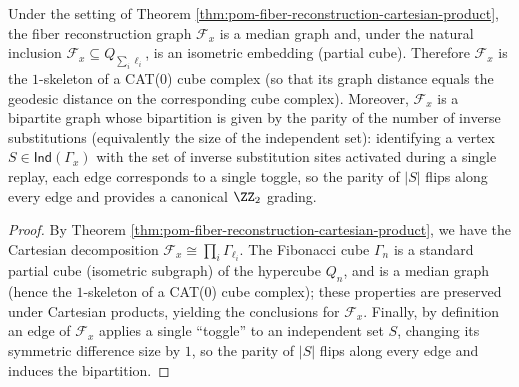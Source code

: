 \begin{corollary}\label{cor:pom-fiber-reconstruction-median-partialcube-cat0}
Under the setting of Theorem \ref{thm:pom-fiber-reconstruction-cartesian-product},
the fiber reconstruction graph \(\mathcal F_x\) is a median graph and, under the natural inclusion
\(
\mathcal F_x\subseteq Q_{\sum_i \ell_i}
\),
is an isometric embedding (partial cube).
Therefore \(\mathcal F_x\) is the \(1\)-skeleton of a CAT(0) cube complex (so that its graph distance equals the geodesic distance on the corresponding cube complex).
Moreover, \(\mathcal F_x\) is a bipartite graph whose bipartition is given by the parity of the number of inverse substitutions (equivalently the size of the independent set):
identifying a vertex \(S\in\mathsf{Ind}(\Gamma_x)\) with the set of inverse substitution sites activated during a single replay, each edge corresponds to a single toggle,
so the parity of \(|S|\) flips along every edge and provides a canonical \(\ZZ_2\) grading.
\end{corollary}
\begin{proof}
By Theorem \ref{thm:pom-fiber-reconstruction-cartesian-product}, we have the Cartesian decomposition \(\mathcal F_x\cong \prod_i \Gamma_{\ell_i}\).
The Fibonacci cube \(\Gamma_n\) is a standard partial cube (isometric subgraph) of the hypercube \(Q_n\), and is a median graph (hence the \(1\)-skeleton of a CAT(0) cube complex); these properties are preserved under Cartesian products, yielding the conclusions for \(\mathcal F_x\).
Finally, by definition an edge of \(\mathcal F_x\) applies a single ``toggle'' to an independent set \(S\), changing its symmetric difference size by \(1\), so the parity of \(|S|\) flips along every edge and induces the bipartition.
\end{proof}

